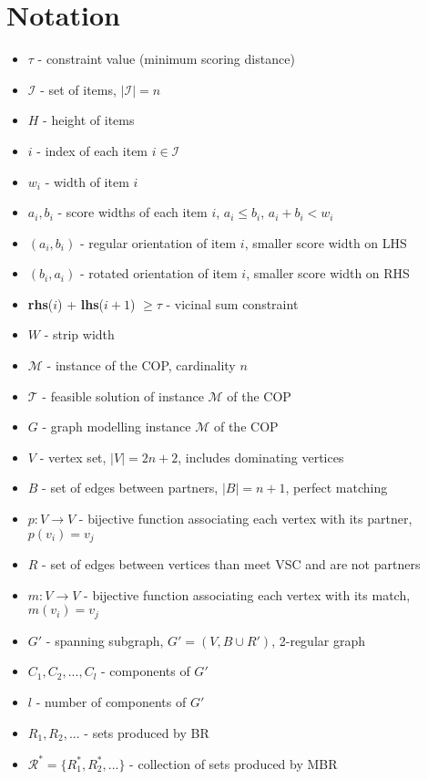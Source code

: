 \documentclass{elsarticle}
\begin{document}
\section{Notation}
\begin{itemize}
	\item $\tau$ - constraint value (minimum scoring distance)
	\item $\mathcal{I}$ - set of items, $|\mathcal{I}| = n$ 
	\item $H$ - height of items
	\item $i$ - index of each item $i \in \mathcal{I}$
	\item $w_i$ - width of item $i$
	\item $a_i, b_i$ - score widths of each item $i$, $a_i \leq b_i$, $a_i + b_i < w_i$
	\item $(a_i, b_i)$ - regular orientation of item $i$, smaller score width on LHS
	\item $(b_i, a_i)$ - rotated orientation of item $i$, smaller score width on RHS
	\item \textbf{rhs}($i$) + \textbf{lhs}($i+1$) $\geq \tau$ - vicinal sum constraint
	\item $W$ - strip width
	\item $\mathcal{M}$ - instance of the COP, cardinality $n$
	\item $\mathcal{T}$ - feasible solution of instance $\mathcal{M}$ of the COP
	\item $G$ - graph modelling instance $\mathcal{M}$ of the COP
	\item $V$ - vertex set, $|V| = 2n + 2$, includes dominating vertices
	\item $B$ - set of edges between partners, $|B| = n+1$, perfect matching
	\item $p : V \to V$ - bijective function associating each vertex with its partner, $p(v_i) = v_j$
	\item $R$ - set of edges between vertices than meet VSC and are not partners
	\item $m : V \to V$ - bijective function associating each vertex with its match, $m(v_i) = v_j$
	\item $G'$ - spanning subgraph, $G' = (V, B \cup R')$, 2-regular graph
	\item $C_1, C_2,..., C_l$ - components of $G'$
	\item $l$ - number of components of $G'$
	\item $R_1, R_2,...$ - sets produced by BR
	\item $\mathcal{R}^* = \{R_{1}^{*}, R_{2}^{*},...\}$ - collection of sets produced by MBR

\end{itemize}
\end{document}
